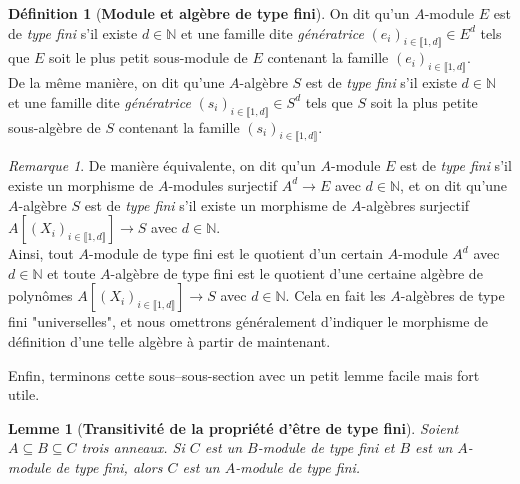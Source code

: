 \documentclass[10pt, twoside]{article}
\theoremstyle{plain}
\theoremstyle{definition}
\newtheorem{definition}[theorem]{Définition}
\theoremstyle{plain}
\theoremstyle{plain}
\newtheorem{lemma}[theorem]{Lemme}
\theoremstyle{definition}
\theoremstyle{remark}
\newtheorem*{remark}{Remarque}
\begin{document}
\begin{definition}[\textbf{Module et algèbre de type fini}]\label{def:mod tf}
    On dit qu'un $A$-module $E$ est de \textit{type fini} s'il existe $d \in \mathbb{N}$ et une famille dite \textit{génératrice} $(e_i)_{i \in \llbracket 1, d \rrbracket} \in E^d$ tels que $E$ soit le plus petit sous-module de $E$ contenant la famille $(e_i)_{i \in \llbracket 1, d \rrbracket}$.\\
    De la même manière, on dit qu'une $A$-algèbre $S$ est de \textit{type fini} s'il existe $d \in \mathbb{N}$ et une famille dite \textit{génératrice} $(s_i)_{i \in \llbracket 1, d \rrbracket} \in S^d$ tels que $S$ soit la plus petite sous-algèbre de $S$ contenant la famille $(s_i)_{i \in \llbracket 1, d \rrbracket}$.
\end{definition}

\begin{remark}
   De manière équivalente, on dit qu'un $A$-module $E$ est de \textit{type fini} s'il existe un morphisme de $A$-modules surjectif $A^d \longrightarrow E$ avec $d \in \mathbb{N}$, et on dit qu'une $A$-algèbre $S$ est de \textit{type fini} s'il existe un morphisme de $A$-algèbres surjectif $A[(X_i)_{i \in \llbracket 1, d \rrbracket}] \longrightarrow S$ avec $d \in \mathbb{N}$.\\
   Ainsi, tout $A$-module de type fini est le quotient d'un certain $A$-module $A^d$ avec $d \in \mathbb{N}$ et toute $A$-algèbre de type fini est le quotient d'une certaine algèbre de polynômes $A[(X_i)_{i \in \llbracket 1, d \rrbracket}] \longrightarrow S$ avec $d \in \mathbb{N}$. Cela en fait les $A$-algèbres de type fini "universelles", et nous omettrons généralement d'indiquer le morphisme de définition d'une telle algèbre à partir de maintenant.
\end{remark}

Enfin, terminons cette sous--sous-section avec un petit lemme facile mais fort utile.

\begin{lemma}[\textbf{Transitivité de la propriété d'être de type fini}]\label{lem:trans tf}
     Soient $A \subseteq B \subseteq C$ trois anneaux. Si $C$ est un $B$-module de type fini et $B$ est un $A$-module de type fini, alors $C$ est un $A$-module de type fini. 
\end{lemma}
\end{document}
